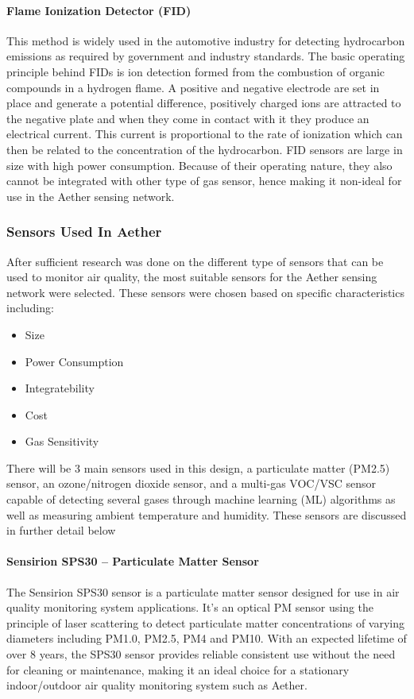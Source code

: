 \paragraph{Flame Ionization Detector (FID)}
This method is widely used in the automotive industry for detecting hydrocarbon emissions as required by government and industry standards. The basic operating principle behind FIDs is ion detection formed from the combustion of organic compounds in a hydrogen flame. A positive and negative electrode are set in place and generate a potential difference, positively charged ions are attracted to the negative plate and when they come in contact with it they produce an electrical current. This current is proportional  to the rate of ionization which can then be related to the concentration of the hydrocarbon. FID sensors are large in size with high power consumption. Because of their operating nature, they also cannot be integrated with other type of gas sensor, hence making it non-ideal for use in the Aether sensing network.

\subsubsection{Sensors Used In Aether}
After sufficient research was done on the different type of sensors that can be used to monitor air quality, the most suitable sensors for the Aether sensing network were selected. These sensors were chosen based on specific characteristics including:

\begin{itemize}
\item Size
\item Power Consumption
\item Integratebility
\item Cost
\item Gas Sensitivity
\end{itemize}

There will be 3 main sensors used in this design, a particulate matter (PM2.5) sensor, an ozone/nitrogen dioxide sensor, and a multi-gas VOC/VSC sensor capable of detecting several gases through machine learning (ML) algorithms as well as measuring ambient temperature and humidity. These sensors are discussed in further detail below
\paragraph{Sensirion SPS30 – Particulate Matter Sensor}
The Sensirion SPS30 sensor is a particulate matter sensor designed for use in air quality monitoring system applications. It’s an optical PM sensor using the principle of laser scattering to detect particulate matter concentrations of varying diameters including PM1.0, PM2.5, PM4 and PM10. With an expected lifetime of over 8 years, the SPS30 sensor provides reliable consistent use without the need for cleaning or maintenance, making it an ideal choice for a stationary indoor/outdoor air quality monitoring system such as Aether.

